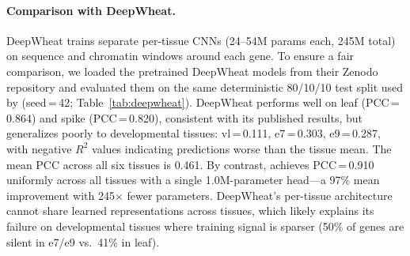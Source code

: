 \begin{methods}
\paragraph{Comparison with DeepWheat.}
DeepWheat \citep{DeepWheat2024} trains separate per-tissue CNNs (24--54M params each, 245M total) on sequence and chromatin windows around each gene. To ensure a fair comparison, we loaded the pretrained DeepWheat models from their Zenodo repository and evaluated them on the same deterministic 80/10/10 test split used by \mytool (seed\,=\,42; Table~\ref{tab:deepwheat}). DeepWheat performs well on leaf (PCC\,=\,0.864) and spike (PCC\,=\,0.820), consistent with its published results, but generalizes poorly to developmental tissues: vl\,=\,0.111, e7\,=\,0.303, e9\,=\,0.287, with negative $R^2$ values indicating predictions worse than the tissue mean. The mean PCC across all six tissues is 0.461. By contrast, \mytool achieves PCC\,=\,0.910 uniformly across all tissues with a single 1.0M-parameter head---a 97\% mean improvement with 245$\times$ fewer parameters. DeepWheat's per-tissue architecture cannot share learned representations across tissues, which likely explains its failure on developmental tissues where training signal is sparser (50\% of genes are silent in e7/e9 vs.\ 41\% in leaf).

\begin{table}[!t]
\end{table}


\end{methods}
